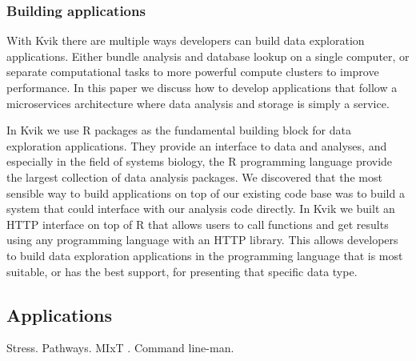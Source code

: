 \subsubsection*{Building applications} 
With Kvik there are multiple ways developers can build data
exploration applications. Either bundle analysis and database lookup on a single
computer, or separate computational tasks to more powerful compute clusters to
improve performance. 
In this paper we discuss how to develop applications that follow a
microservices architecture where data analysis and storage is simply a service. 

In Kvik we use R packages as the fundamental building block for data exploration
applications. They provide an interface to data and analyses, and especially in
the field of systems biology, the R programming language provide the largest
collection of data analysis packages. %
We discovered that the most sensible way to build applications on top of our
existing code base was to build a system that could interface with our analysis
code directly. In Kvik we built an HTTP interface on top of R that allows users
to call functions and get results using any programming language with an HTTP
library. This allows developers to build data exploration applications in the
programming language that is most suitable, or has the best support, for
presenting that specific data type. 


\subsection*{Applications}
Stress.
Pathways.
MIxT .
Command line-man. 





